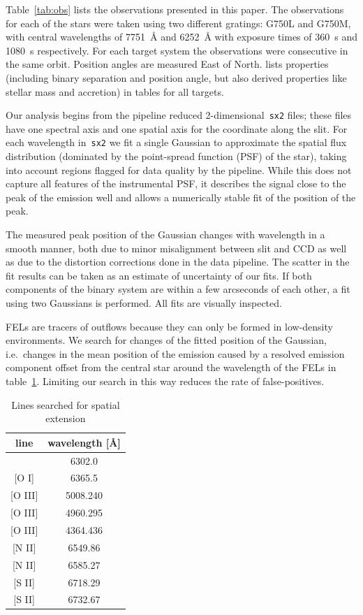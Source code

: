\documentclass[twocolumn,trackchanges]{aastex63}
\begin{document}
Table~\ref{tab:obs} lists the observations presented in this paper. The
observations for each of the stars were taken using two different gratings:
G750L and G750M, with central wavelengths of 7751~\AA{} and 6252~\AA{} with
exposure times of 360~s and 1080~s respectively. For each target system the observations were consecutive in the same orbit. Position angles are measured East of North. \citet{2003ApJ...583..334H} lists properties (including binary separation and position angle, but also derived properties like stellar mass and accretion) in tables for all targets.

Our analysis begins from the pipeline reduced
2-dimensional~\texttt{sx2} files; these files have one spectral axis and
one spatial axis for the coordinate along the slit. For each wavelength
in~\texttt{sx2} we fit a single Gaussian to approximate the spatial flux distribution (dominated by the point-spread function (PSF) of the star), taking into account regions
flagged for data quality by the pipeline. While this does not capture
all features of the instrumental PSF, it describes the signal close to the
peak of the emission well and allows a numerically stable fit of the
position of the peak.

The measured peak position  of the Gaussian changes with
wavelength in a smooth manner, both due to minor misalignment between slit and CCD as well as due to the distortion corrections done in the data
pipeline. The scatter in the fit results can be
taken as an estimate of uncertainty of our fits.
If both components of the binary system are within a few arcseconds of
each other, a fit using two Gaussians is performed. All fits are
visually inspected. 

FELs are tracers of outflows because they can only be formed in low-density
environments. We search for changes
of the fitted position of the Gaussian, i.e.\ changes in the mean
position of the emission caused by a resolved emission component offset from
the central star around the wavelength of the FELs in table~\ref{tab:searchedlines}. Limiting our search in this way reduces the
rate of false-positives. 


\begin{table}
\caption{{Lines searched for spatial extension\label{tab:searchedlines}}}
\begin{center}
\begin{tabular}{cc}
\hline\hline
line & wavelength [\AA] \\
\hline
[O I] & 6302.0\\{}
[O I] & 6365.5\\{}
[O III] & 5008.240\\{}
[O III] & 4960.295\\{}
[O III] & 4364.436\\{}
[N II] & 6549.86\\{}
[N II] & 6585.27\\{}
[S II] & 6718.29\\{}
[S II] & 6732.67\\
\hline
\end{tabular}
\end{center}
\end{table}
\end{document}

